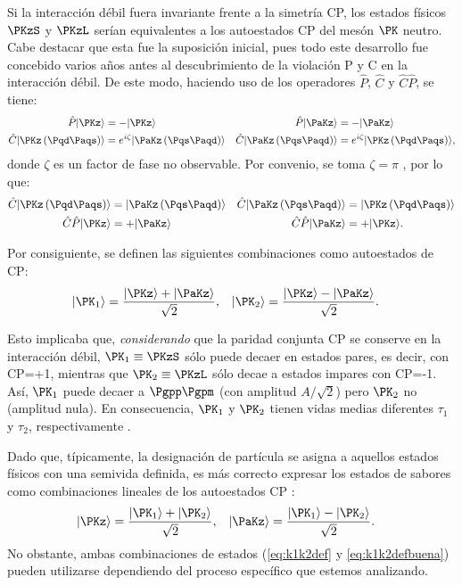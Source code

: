 Si la interacción débil fuera invariante frente a la simetría CP, los estados físicos $\PKzS$ y $\PKzL$ serían equivalentes a los autoestados CP del mesón $\PK$ neutro. Cabe destacar que esta fue la suposición inicial, pues todo este desarrollo fue concebido varios años antes al descubrimiento de la violación P y C en la interacción débil. De este modo, haciendo uso de los operadores $\hat{P}$, $\hat{C}$ y $\hat{C}\hat{P}$, se tiene:
\begin{align}
\hat{P}|\PKz\rangle &= -|\PKz\rangle & \hat{P}|\PaKz\rangle &= -|\PaKz\rangle\\
\hat{C}|\PKz\left(\Pqd\Paqs\right)\rangle &= e^{i\zeta}|\PaKz\left(\Pqs\Paqd\right)\rangle & \hat{C}|\PaKz\left(\Pqs\Paqd\right)\rangle &= e^{i\zeta}|\PKz\left(\Pqd\Paqs\right)\rangle ,
\end{align}
donde $\zeta$ es un factor de fase no observable. Por convenio, se toma $\zeta=\pi$ \cite{Thomson}, por lo que:
\begin{align}
\hat{C}|\PKz\left(\Pqd\Paqs\right)\rangle &=|\PaKz\left(\Pqs\Paqd\right)\rangle & \hat{C}|\PaKz\left(\Pqs\Paqd\right)\rangle &= |\PKz\left(\Pqd\Paqs\right)\rangle\\
\hat{C}\hat{P}|\PKz\rangle &= +|\PaKz\rangle & \hat{C}\hat{P}|\PaKz\rangle &= +|\PKz\rangle .
\end{align}

Por consiguiente, se definen las siguientes combinaciones como autoestados de CP:
\begin{align}
|\PK_{1}\rangle &= \dfrac{|\PKz\rangle + |\PaKz\rangle}{\sqrt{2}}, & |\PK_{2}\rangle &= \dfrac{|\PKz\rangle - |\PaKz\rangle}{\sqrt{2}}.\label{eq:k1k2def}
\end{align}

Esto implicaba que, \textit{considerando} que la paridad conjunta CP se conserve en la interacción débil, $\PK_{1} \equiv \PKzS$ sólo puede decaer en estados pares, es decir, con CP=+1, mientras que $\PK_{2} \equiv \PKzL$ sólo decae a estados impares con CP=-1. Así, $\PK_{1}$ puede decaer a $\Pgpp \Pgpm$ (con amplitud $A/ \sqrt{2}$) pero $\PK_{2}$ no (amplitud nula). En consecuencia, $\PK_{1}$ y $\PK_{2}$ tienen vidas medias diferentes $\tau_{1}$ y $\tau_{2}$, respectivamente \cite{Pais} \cite{Perkins}.

Dado que, típicamente, la designación de partícula se asigna a aquellos estados físicos con una semivida definida, es más correcto expresar los estados de sabores como combinaciones lineales de los autoestados CP \cite{Pais}:
\begin{align}
|\PKz\rangle &= \dfrac{|\PK_{1}\rangle + |\PK_{2}\rangle}{\sqrt{2}}, & |\PaKz\rangle &= \dfrac{|\PK_{1}\rangle - |\PK_{2}\rangle}{\sqrt{2}}.\label{eq:k1k2defbuena}
\end{align}
No obstante, ambas combinaciones de estados (\ref{eq:k1k2def} y \ref{eq:k1k2defbuena}) pueden utilizarse dependiendo del proceso específico que estemos analizando.

